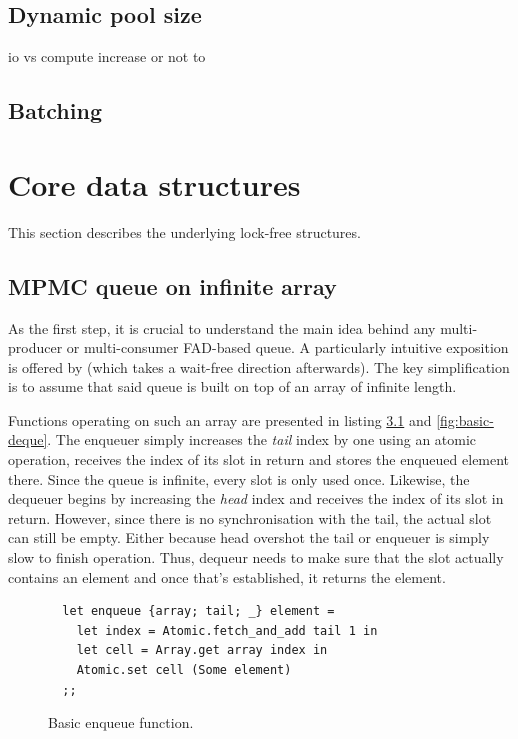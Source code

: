 \documentclass[12pt,a4paper,twoside]{report}
\begin{document}
\section{Dynamic pool size}

io vs compute increase or not to
\section{Batching}




\chapter{Core data structures}
\label{section:underlying_data_structures}

This section describes the underlying lock-free structures. 

\section{MPMC queue on infinite array}
\label{section:mpmc_queue_on_inf}
As the first step, it is crucial to understand the main idea behind any multi-producer or multi-consumer FAD-based queue. A particularly intuitive exposition is offered by \cite{Yang2016} (which takes a wait-free direction afterwards). The key simplification is to assume that said queue is built on top of an array of infinite length. 

Functions operating on such an array are presented in listing \ref{fig:basic-enqueue} and \ref{fig:basic-deque}. The enqueuer simply increases the \textit{tail} index by one using an atomic operation, receives the index of its slot in return and stores the enqueued element there. Since the queue is infinite, every slot is only used once. Likewise, the dequeuer begins by increasing the \textit{head} index and receives the index of its slot in return. However, since there is no synchronisation with the tail, the actual slot can still be empty. Either because head overshot the tail or enqueuer is simply slow to finish operation. Thus, dequeur needs to make sure that the slot actually contains an element and once that's established, it returns the element. 


\begin{figure} 
    \centering
    \begin{verbatim}
  let enqueue {array; tail; _} element = 
    let index = Atomic.fetch_and_add tail 1 in
    let cell = Array.get array index in 
    Atomic.set cell (Some element)
  ;;
    \end{verbatim}
    \caption{Basic enqueue function.}
    \label{fig:basic-enqueue}
\end{figure}
\end{document}
